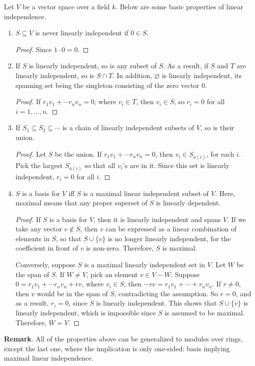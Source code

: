 \documentclass[12pt]{article}
\begin{document}
Let $V$ be a vector space over a field $k$.  Below are some basic properties of linear independence.

\begin{enumerate}
\item $S\subseteq V$ is never linearly independent if $0\in S$.
\begin{proof} Since $1\cdot 0=0$. \end{proof}
\item If $S$ is linearly independent, so is any subset of $S$.  As a result, if $S$ and $T$ are linearly independent, so is $S\cap T$.  In addition, $\varnothing$ is linearly independent, its spanning set being the singleton consisting of the zero vector $0$.
\begin{proof} If $r_1v_1+\cdots r_nv_n=0$, where $v_i\in T$, then $v_i\in S$, so $r_i=0$ for all $i=1,\ldots, n$. \end{proof}
\item If $S_1\subseteq S_2\subseteq \cdots$ is a chain of linearly independent subsets of $V$, so is their union.
\begin{proof} Let $S$ be the union.  If $r_1v_1+\cdots r_nv_n=0$, then $v_i\in S_{a(i)}$, for each $i$.  Pick the largest $S_{a(i)}$ so that all $v_i$'s are in it.  Since this set is linearly independent, $r_i=0$ for all $i$.  
\end{proof}
\item $S$ is a basis for $V$ iff $S$ is a maximal linear independent subset of $V$.  Here, maximal means that any proper superset of $S$ is linearly dependent.
\begin{proof} If $S$ is a basis for $V$, then it is linearly independent and spans $V$.  If we take any vector $v\notin S$, then $v$ can be expressed as a linear combination of elements in $S$, so that $S\cup \lbrace v\rbrace$ is no longer linearly independent, for the coefficient in front of $v$ is non-zero.  Therefore, $S$ is maximal.  

Conversely, suppose $S$ is a maximal linearly independent set in $V$.  Let $W$ be the span of $S$.  If $W\ne V$, pick an element $v\in V-W$.  Suppose $0=r_1v_1+\cdots r_nv_n+rv$, where $v_i\in S$, then $-rv = r_1v_1+\cdots +r_nv_n$.  If $r\ne 0$, then $v$ would be in the span of $S$, contradicting the assumption.  So $r=0$, and as a result, $r_i=0$, since $S$ is linearly independent.  This shows that $S\cup \lbrace v\rbrace$ is linearly independent, which is impossible since $S$ is assumed to be maximal.  Therefore, $W=V$.
\end{proof}
\end{enumerate}

\textbf{Remark}.  All of the properties above can be generalized to modules over rings, except the last one, where the implication is only one-sided: basis implying maximal linear independence.
\end{document}
